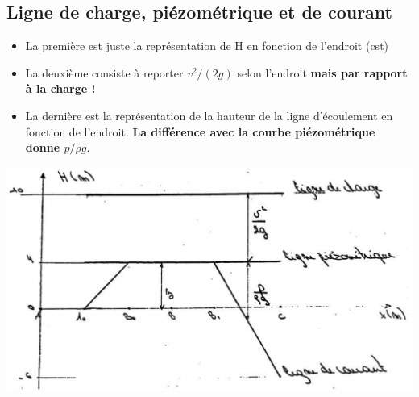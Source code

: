 \subsection*{Ligne de charge, piézométrique et de courant}
\begin{itemize}
	\item La première est juste la représentation de H en fonction de l'endroit (cst)
	\item La deuxième consiste à reporter $v^2/(2 g)$ selon l'endroit \textbf{mais par rapport à la charge !}
	\item La dernière est la représentation de la hauteur de la ligne d'écoulement en fonction de l'endroit. \textbf{La différence avec la courbe piézométrique donne $p/\rho g$}.
\end{itemize}
\begin{center}
	\includegraphics[scale=0.3]{tp6}
\end{center}